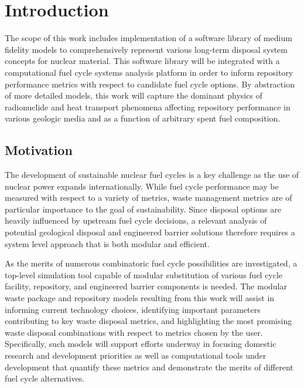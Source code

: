 \chapter{Introduction}\label{ch:introduction}


The scope of this work includes implementation of a software library of medium 
fidelity models to comprehensively represent various long-term disposal system 
concepts for nuclear material. This software library will be integrated with a 
computational fuel cycle systems analysis platform in order to inform repository 
performance metrics with respect to candidate fuel cycle options. By abstraction 
of more detailed models, this work will capture the dominant physics of 
radionuclide and heat transport phenomena affecting repository performance in 
various geologic media and as a function of arbitrary spent fuel composition. 

\section{Motivation} 


The development of sustainable nuclear fuel cycles is a key challenge as the use 
of nuclear power expands internationally. While fuel cycle performance may be 
measured with respect to a variety of metrics, waste management metrics are of 
particular importance to the goal of sustainability. Since disposal options are 
heavily influenced by upstream fuel cycle decisions, a relevant analysis of 
potential geological disposal and engineered barrier solutions therefore 
requires a system level approach that is both modular and efficient. 


As the merits of numerous combinatoric fuel cycle possibilities are 
investigated, a top-level simulation tool capable of modular substitution of 
various fuel cycle facility, repository, and engineered barrier components is 
needed. The modular waste package and repository models resulting from this work 
will assist in informing current technology choices, identifying important 
parameters contributing to key waste disposal metrics, and highlighting the most 
promising waste disposal combinations with respect to metrics chosen by
the user. Specifically, such models will support efforts underway in focusing 
domestic research and development priorities as well as computational tools 
under development that quantify these metrics and demonstrate the merits of 
different fuel cycle alternatives. 

